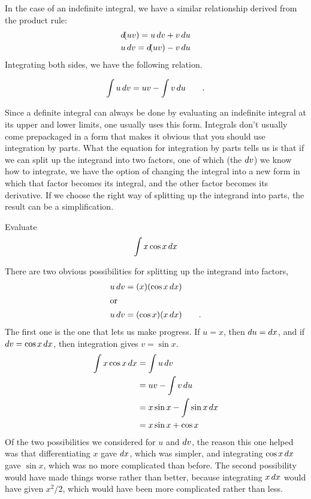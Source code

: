 In the case of an indefinite integral, we have a similar relationship
derived from the product rule:
\begin{gather*}
  \mathop{d\!}(uv) = u \mathop{d\!} v + v \mathop{d\!} u \\
  u \mathop{d\!} v = \mathop{d\!}(uv) - v \mathop{d\!} u 
\end{gather*}
Integrating both sides, we have the following relation.
\begin{important}
\begin{equation*}
  \int u \mathop{d\!} v = uv - \int v \mathop{d\!} u \qquad .
\end{equation*}
\end{important}
Since a definite integral can always be done by evaluating an indefinite
integral at its upper and lower limits, one usually uses this form.
Integrals don't usually come prepackaged in a form that makes it
obvious that you should use integration by parts. What the equation for
integration by parts tells us is that if we can split up the integrand
into two factors, one of which (the $\mathop{d\!} v$) we know how to integrate, we have
the option of changing the integral into a new form in which that factor
becomes its integral, and the other factor becomes its derivative. If we
choose the right way of splitting up the integrand into parts, the result can be
a simplification.

\begin{eg}
\egquestion Evaluate
\begin{equation*}
  \int x \cos x \mathop{d\!} x
\end{equation*}

\egquestion There are two obvious possibilities for splitting up the integrand
into factors,
\begin{align*}
  u \mathop{d\!} v &= (x)(\cos x\mathop{d\!} x) \\
\intertext{or}
  u \mathop{d\!} v &= (\cos x)(x\mathop{d\!} x) \qquad .
\end{align*}
The first one is the one that lets us make progress. If $u=x$, then
$\mathop{d\!} u=\mathop{d\!} x$, and if $\mathop{d\!} v=\cos x\mathop{d\!} x$, then integration
gives $v=\sin x$.
\begin{align*}
  \int x \cos x \mathop{d\!} x &= \int u \mathop{d\!} v \\
                       &= uv - \int v \mathop{d\!} u \\
                       &= x\sin x-\int \sin x \mathop{d\!} x \\
                       &= x\sin x+\cos x
\end{align*}
Of the two possibilities we considered for $u$ and $\mathop{d\!} v$, the reason
this one helped was that differentiating $x$ gave $\mathop{d\!} x$, which was
simpler, and integrating $\cos x\mathop{d\!} x$ gave $\sin x$, which was no
more complicated than before. The second possibility would have made
things worse rather than better, because integrating $x\mathop{d\!} x$ would
have given $x^2/2$, which would have been more complicated rather than
less.
\end{eg}


